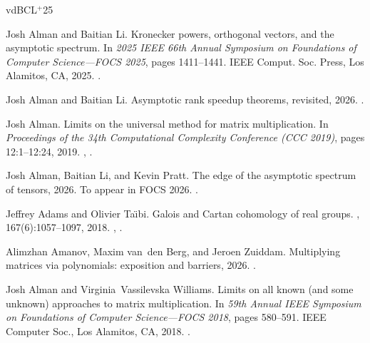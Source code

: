 \documentclass[11pt,letterpaper]{article}
\begin{document}

\newcommand{\etalchar}[1]{$^{#1}$}
\begin{thebibliography}{vdBCL{\etalchar{+}}25}

Josh Alman and Baitian Li.
\newblock Kronecker powers, orthogonal vectors, and the asymptotic spectrum.
\newblock In {\em 2025 {IEEE} 66th {A}nnual {S}ymposium on {F}oundations of
  {C}omputer {S}cience---{FOCS} 2025}, pages 1411--1441. IEEE Comput. Soc.
  Press, Los Alamitos, CA, 2025.
\newblock \href {https://doi.org/10.1109/FOCS63196.2025.00074}
  {}.

Josh Alman and Baitian Li.
\newblock Asymptotic rank speedup theorems, revisited, 2026.
\newblock \href {https://arxiv.org/abs/2605.21738} {}.

Josh Alman.
\newblock Limits on the universal method for matrix multiplication.
\newblock In {\em Proceedings of the 34th Computational Complexity Conference
  ({CCC} 2019)}, pages 12:1--12:24, 2019.
\newblock \href {https://arxiv.org/abs/1812.08731} {},
  \href {https://doi.org/10.4230/LIPIcs.CCC.2019.12}
  {}.

Josh Alman, Baitian Li, and Kevin Pratt.
\newblock The edge of the asymptotic spectrum of tensors, 2026.
\newblock To appear in FOCS 2026.
\newblock \href {https://arxiv.org/abs/2604.01386} {}.

Jeffrey Adams and Olivier Ta\"{\i}bi.
\newblock Galois and {C}artan cohomology of real groups.
, 167(6):1057--1097, 2018.
\newblock \href {https://arxiv.org/abs/1611.05956} {},
  \href {https://doi.org/10.1215/00127094-2017-0052}
  {}.

Alimzhan Amanov, Maxim van~den Berg, and Jeroen Zuiddam.
\newblock Multiplying matrices via polynomials: exposition and barriers, 2026.
\newblock \href {https://arxiv.org/abs/2610.30054} {}.

Josh Alman and Virginia~Vassilevska Williams.
\newblock Limits on all known (and some unknown) approaches to matrix
  multiplication.
\newblock In {\em 59th {A}nnual {IEEE} {S}ymposium on {F}oundations of
  {C}omputer {S}cience---{FOCS} 2018}, pages 580--591. IEEE Computer Soc., Los
  Alamitos, CA, 2018.
\newblock \href {https://doi.org/10.1109/FOCS.2018.00061}
  {}.


\end{thebibliography}
\end{document}
